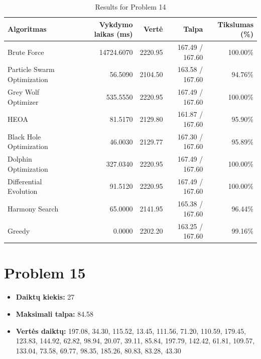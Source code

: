 \documentclass[a4paper,11pt]{article}
\begin{document}
\begin{table}[h!]
\centering
\begin{tabular}{lrrrr}
\toprule
\textbf{Algoritmas} & \textbf{Vykdymo laikas (ms)} & \textbf{Vertė} & \textbf{Talpa} & \textbf{Tikslumas (\%)} \\
\midrule
Brute Force & 14724.6070 & 2220.95 & 167.49 / 167.60 & 100.00\% \\
Particle Swarm Optimization & 56.5090 & 2104.50 & 163.58 / 167.60 & 94.76\% \\
Grey Wolf Optimizer & 535.5550 & 2220.95 & 167.49 / 167.60 & 100.00\% \\
HEOA & 81.5170 & 2129.80 & 161.87 / 167.60 & 95.90\% \\
Black Hole Optimization & 46.0030 & 2129.77 & 167.30 / 167.60 & 95.89\% \\
Dolphin Optimization & 327.0340 & 2220.95 & 167.49 / 167.60 & 100.00\% \\
Differential Evolution & 91.5120 & 2220.95 & 167.49 / 167.60 & 100.00\% \\
Harmony Search & 65.0000 & 2141.95 & 165.38 / 167.60 & 96.44\% \\
Greedy & 0.0000 & 2202.20 & 163.25 / 167.60 & 99.16\% \\
\bottomrule
\end{tabular}
\caption{Results for Problem 14}
\end{table}
\clearpage

\section*{Problem 15}
\begin{itemize}
    \item \textbf{Daiktų kiekis:} 27
    \item \textbf{Maksimali talpa:} 84.58
    \item \textbf{Vertės daiktų:} 197.08, 34.30, 115.52, 13.45, 111.56, 71.20, 110.59, 179.45, 123.83, 144.92, 62.82, 98.94, 20.07, 39.11, 85.84, 197.79, 142.42, 61.81, 109.57, 133.04, 73.58, 69.77, 98.35, 185.26, 80.83, 83.28, 43.30
\end{itemize}
\end{document}
